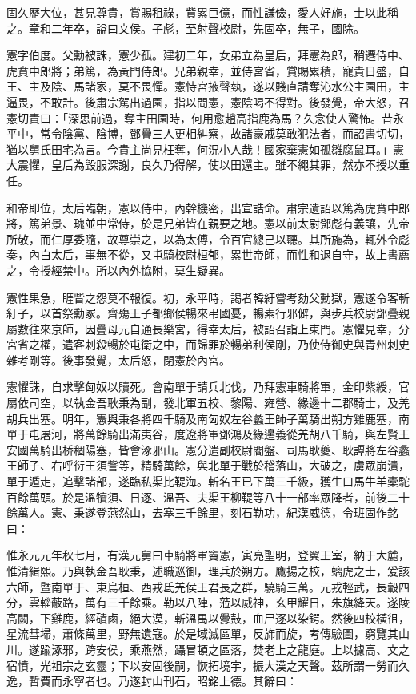 \begin{pinyinscope}
固久歷大位，甚見尊貴，賞賜租祿，貲累巨億，而性謙儉，愛人好施，士以此稱之。章和二年卒，謚曰文侯。子彪，至射聲校尉，先固卒，無子，國除。

憲字伯度。父勳被誅，憲少孤。建初二年，女弟立為皇后，拜憲為郎，稍遷侍中、虎賁中郎將；弟篤，為黃門侍郎。兄弟親幸，並侍宮省，賞賜累積，寵貴日盛，自王、主及陰、馬諸家，莫不畏憚。憲恃宮掖聲埶，遂以賤直請奪沁水公主園田，主逼畏，不敢計。後肅宗駕出過園，指以問憲，憲陰喝不得對。後發覺，帝大怒，召憲切責曰：「深思前過，奪主田園時，何用愈趙高指鹿為馬？久念使人驚怖。昔永平中，常令陰黨、陰博，鄧疊三人更相糾察，故諸豪戚莫敢犯法者，而詔書切切，猶以舅氏田宅為言。今貴主尚見枉奪，何況小人哉！國家棄憲如孤雛腐鼠耳。」憲大震懼，皇后為毀服深謝，良久乃得解，使以田還主。雖不繩其罪，然亦不授以重任。

和帝即位，太后臨朝，憲以侍中，內幹機密，出宣誥命。肅宗遺詔以篤為虎賁中郎將，篤弟景、瑰並中常侍，於是兄弟皆在親要之地。憲以前太尉鄧彪有義讓，先帝所敬，而仁厚委隨，故尊崇之，以為太傅，令百官總己以聽。其所施為，輒外令彪奏，內白太后，事無不從，又屯騎校尉桓郁，累世帝師，而性和退自守，故上書薦之，令授經禁中。所以內外協附，莫生疑異。

憲性果急，睚眥之怨莫不報復。初，永平時，謁者韓紆嘗考劾父勳獄，憲遂令客斬紆子，以首祭勳冢。齊殤王子都鄉侯暢來弔國憂，暢素行邪僻，與步兵校尉鄧疊親屬數往來京師，因疊母元自通長樂宮，得幸太后，被詔召詣上東門。憲懼見幸，分宮省之權，遣客刺殺暢於屯衛之中，而歸罪於暢弟利侯剛，乃使侍御史與青州刺史雜考剛等。後事發覺，太后怒，閉憲於內宮。

憲懼誅，自求擊匈奴以贖死。會南單于請兵北伐，乃拜憲車騎將軍，金印紫綬，官屬依司空，以執金吾耿秉為副，發北軍五校、黎陽、雍營、緣邊十二郡騎士，及羌胡兵出塞。明年，憲與秉各將四千騎及南匈奴左谷蠡王師子萬騎出朔方雞鹿塞，南單于屯屠河，將萬餘騎出滿夷谷，度遼將軍鄧鴻及緣邊義從羌胡八千騎，與左賢王安國萬騎出桥稒陽塞，皆會涿邪山。憲分遣副校尉閻盤、司馬耿夔、耿譚將左谷蠡王師子、右呼衍王須訾等，精騎萬餘，與北單于戰於稽落山，大破之，虜眾崩潰，單于遁走，追擊諸部，遂臨私渠比鞮海。斬名王已下萬三千級，獲生口馬牛羊橐駝百餘萬頭。於是溫犢須、日逐、溫吾、夫渠王柳鞮等八十一部率眾降者，前後二十餘萬人。憲、秉遂登燕然山，去塞三千餘里，刻石勒功，紀漢威德，令班固作銘曰：

惟永元元年秋七月，有漢元舅曰車騎將軍竇憲，寅亮聖明，登翼王室，納于大麓，惟清緝熙。乃與執金吾耿秉，述職巡御，理兵於朔方。鷹揚之校，螭虎之士，爰該六師，暨南單于、東烏桓、西戎氐羌侯王君長之群，驍騎三萬。元戎輕武，長轂四分，雲輜蔽路，萬有三千餘乘。勒以八陣，蒞以威神，玄甲耀日，朱旗絳天。遂陵高闕，下雞鹿，經磧鹵，絕大漠，斬溫禺以釁鼓，血尸逐以染鍔。然後四校橫徂，星流彗埽，蕭條萬里，野無遺寇。於是域滅區單，反旆而旋，考傳驗圖，窮覽其山川。遂踰涿邪，跨安侯，乘燕然，躡冒頓之區落，焚老上之龍庭。上以攄高、文之宿憤，光祖宗之玄靈；下以安固後嗣，恢拓境宇，振大漢之天聲。茲所謂一勞而久逸，暫費而永寧者也。乃遂封山刊石，昭銘上德。其辭曰：


\end{pinyinscope}
